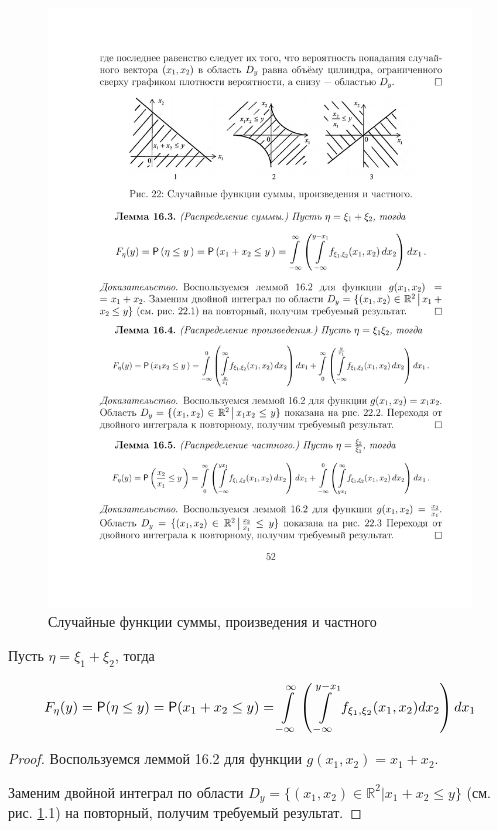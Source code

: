 \begin{figure}[H]
	\centering
	\includegraphics[]{pic/pic22}
	\caption{Случайные функции суммы, произведения и частного}
	\label{fig22}
\end{figure}

\begin{lemma}
\label{lemma:16.3}
Пусть $\eta = \xi_1 + \xi_2$, тогда

\begin{gather*}
	F_\eta (y) = \P ( \eta \leq y ) = \P(x_1+x_2 \leq y )=
	\int\limits_{-\infty}^{\infty}\left(
		\int\limits_{-\infty}^{y-x_1 } f_{\xi_1,\xi_2} (x_1 , x_2 ) dx_2
	\right)dx_1
\end{gather*}
\end{lemma}
\begin{proof}
Воспользуемся леммой 16.2 для функции $g(x_1 , x_2 )=x_1 + x_2$. 

Заменим двойной интеграл по области $D_y = \{(x_1 , x_2 ) \in \mathbb{R}^2 | x_1 +
x_2 \leq y\}$ (см. рис. \ref{fig22}.1) на повторный, получим требуемый результат.	
\end{proof}

